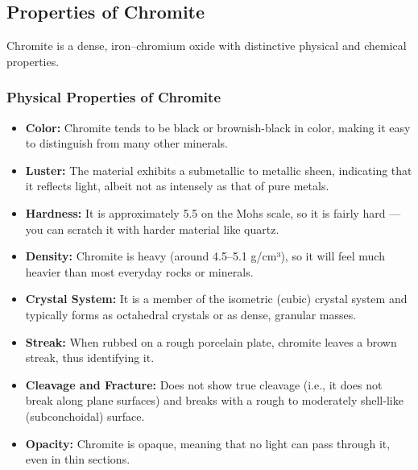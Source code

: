 \documentclass[12pt,a4paper, top=1.9cm, bottom=2.03cm, left=3.81cm, right=1.9cm]{article}
\begin{document}
\subsection{Properties of Chromite}
\noindent\fontsize{12}{14}\selectfont Chromite is a dense, iron–chromium oxide with distinctive physical and chemical properties.
\subsubsection{Physical Properties of Chromite}
\begin{itemize}[label=\textbullet]  %
\item \textbf{Color:} Chromite tends to be black or brownish-black in color, making it easy to distinguish from many other minerals.
\item \textbf{Luster:} The material exhibits a submetallic to metallic sheen, indicating that it reflects light, albeit not as intensely as that of pure metals.
\item \textbf{Hardness:} It is approximately 5.5 on the Mohs scale, so it is fairly hard — you can scratch it with harder material like quartz.
\item \textbf{Density:} Chromite is heavy (around 4.5–5.1 g/cm³), so it will feel much heavier than most everyday rocks or minerals.
\item \textbf{Crystal System:} It is a member of the isometric (cubic) crystal system and typically forms as octahedral crystals or as dense, granular masses.
\item \textbf{Streak:} When rubbed on a rough porcelain plate, chromite leaves a brown streak, thus identifying it.
\item \textbf{Cleavage and Fracture:} Does not show true cleavage (i.e., it does not break along plane surfaces) and breaks with a rough to moderately shell-like (subconchoidal) surface.
\item \textbf{Opacity:} Chromite is opaque, meaning that no light can pass through it, even in thin sections.
\end{itemize}
\end{document}

